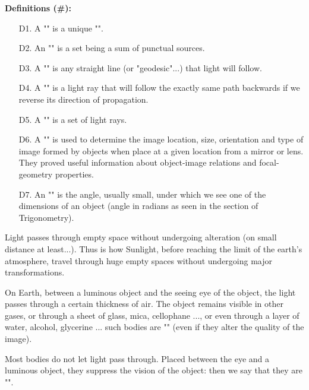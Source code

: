 	\textbf{Definitions (\#\mydef):}
	\begin{enumerate}
		\item[D1.] A "" is a unique "".
		
		\item[D2.] An "" is a set being a sum of punctual sources.
		
		\item[D3.] A "" is any straight line (or "geodesic"...) that light will follow.
		
		\item[D4.] A "" is a light ray that will follow the exactly same path backwards if we reverse its direction of propagation.
		
		\item[D5.] A "" is a set of light rays.
		
		\item[D6.] A "" is used to determine the image location, size, orientation and type of image formed by objects when place at a given location from a mirror or lens. They proved useful information about object-image relations and focal-geometry properties.
		
		\item[D7.] An "" is the angle, usually small, under which we see  one of the dimensions of an object (angle in radians as seen in the section of Trigonometry).
	\end{enumerate}
	Light passes through empty space without undergoing alteration (on small distance at least...). Thus is how Sunlight, before reaching the limit of the earth's atmosphere, travel through huge empty spaces without undergoing major transformations.
	
	On Earth, between a luminous object and the seeing eye of  the object, the light passes through a certain thickness of air. The object remains visible in other gases, or through a sheet of glass, mica, cellophane ..., or even through a layer of water, alcohol, glycerine ... such bodies are "" (even if they alter the quality of the image).
	
	Most bodies do not let light pass through. Placed between the eye and a luminous object, they suppress the vision of the object: then we say that they are "".
	
